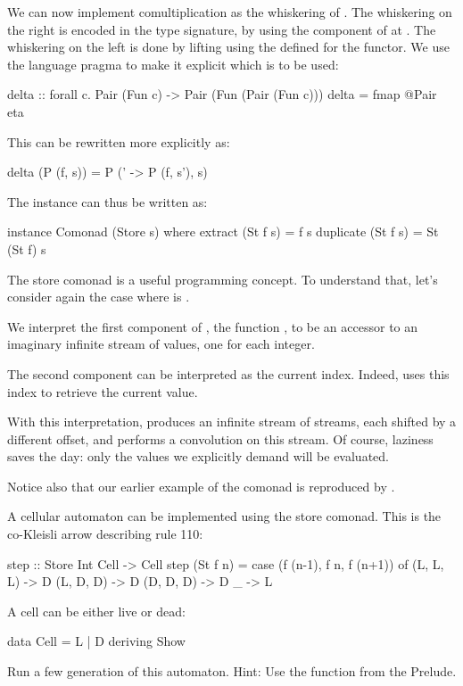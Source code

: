 \documentclass[DaoFP]{subfiles}
\begin{document}
We can now implement comultiplication as the whiskering of . The whiskering on the right is encoded in the type signature, by using the component of  at . The whiskering on the left is done by lifting  using the  defined for the  functor. We use the language pragma  to make it explicit which  is to be used:
\begin{haskell}
delta :: forall c. Pair (Fun c) -> Pair (Fun (Pair (Fun c)))
delta = fmap @Pair eta
\end{haskell}
This can be rewritten more explicitly as:
\begin{haskell}
delta (P (f, s)) = P (\s' -> P (f, s'), s)
\end{haskell}

The  instance can thus be written as:
\begin{haskell}
instance Comonad (Store s) where
  extract (St f s) = f s
  duplicate (St f s) = St (St f) s
\end{haskell}

The store comonad is a useful programming concept. To understand that, let's consider again the case where  is . 

We interpret the first component of , the function , to be an accessor to an imaginary infinite stream of values, one for each integer. 

The second component can be interpreted as the current index. Indeed,  uses this index to retrieve the current value.

With this interpretation,  produces an infinite stream of streams, each shifted by a different offset, and  performs a convolution on this stream. Of course, laziness saves the day: only the values we explicitly demand will be evaluated.

Notice also that our earlier example of the  comonad is reproduced by .

\begin{exercise}
A cellular automaton can be implemented using the store comonad. This is the co-Kleisli arrow describing rule 110:
\begin{haskell}
step :: Store Int Cell -> Cell
step (St f n) = 
    case (f (n-1), f n, f (n+1)) of
    (L, L, L) -> D
    (L, D, D) -> D
    (D, D, D) -> D
    _ -> L
\end{haskell}
A cell can be either live or dead:
\begin{haskell}
data Cell = L | D 
    deriving Show
\end{haskell}
Run a few generation of this automaton. Hint: Use the function  from the Prelude.
\end{exercise}
\end{document}
